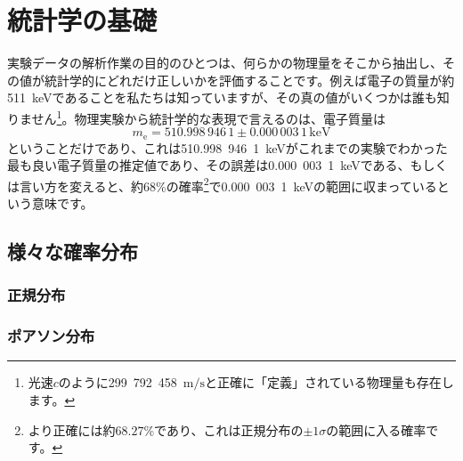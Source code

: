 \chapter{統計学の基礎}
\label{chap_Statistics}

実験データの解析作業の目的のひとつは、何らかの物理量をそこから抽出し、その値が統計学的にどれだけ正しいかを評価することです。例えば電子の質量が約511~keVであることを私たちは知っていますが、その真の値がいくつかは誰も知りません\footnote{光速$c$のように299~792~458~$\mathrm{m}/\mathrm{s}$と正確に「定義」されている物理量も存在します。}。物理実験から統計学的な表現で言えるのは、電子質量は
\begin{equation}
  m_\mathrm{e} = 510.998\,946\,1\pm0.000\,003\,1\,\mathrm{keV}
\end{equation}
ということだけであり\cite{Patrignani:2016:Review-of-Particle-Physics}、これは510.998~946~1~keVがこれまでの実験でわかった最も良い電子質量の推定値であり、その誤差は0.000~003~1~keVである、もしくは言い方を変えると、約68\%の確率\footnote{より正確には約$68.27$\%であり、これは正規分布の$\pm1\sigma$の範囲に入る確率です。}で0.000~003~1~keVの範囲に収まっているという意味です。



\section{様々な確率分布}
\subsection{正規分布}
\subsection{ポアソン分布}



